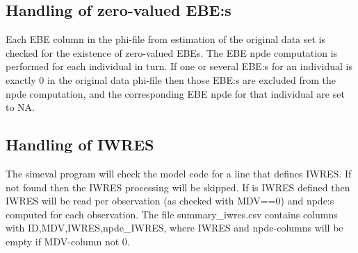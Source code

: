 \subsection{Handling of zero-valued EBE:s}
Each EBE column in the phi-file from estimation of the original data set is checked for the existence of
zero-valued EBEs.
The EBE npde computation is performed for each individual in turn. If one or several EBE:s for
an individual is exactly 0 in the original data phi-file then those EBE:s are excluded from the npde computation,
and the corresponding EBE npde for that individual are set to NA.

\subsection{Handling of IWRES}
The simeval program will check the model code for a line that defines IWRES.
If not found then the IWRES processing will be skipped.
If is IWRES defined then IWRES will be read per observation (as checked with MDV==0)
and npde:s computed for each observation.
The file summary\_iwres.csv contains columns with ID,MDV,IWRES,npde\_IWRES,
where IWRES and npde-columns will be empty if MDV-column not 0.



